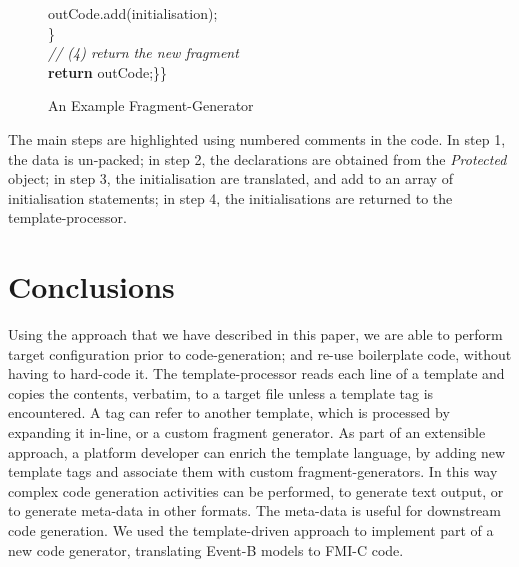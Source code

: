 \documentclass{llncs}%
\begin{document}
\begin{figure}[t]
\begin{minipage}{0.95\textwidth}
\begin{spacing}{0.8}
\hspace*{0.4cm}outCode.add(initialisation);\\
\hspace*{0.2cm}\}\\
\hspace*{0.2cm}\emph{// (4) return the new fragment}\\
\hspace*{0.2cm}\textbf{return} outCode;\}\}
\normalsize
\end{spacing}
\end{minipage}
\caption{An Example Fragment-Generator}
\label{fig:genCode}
\end{figure}
%
%
The main steps are highlighted using numbered comments in the code. In step 1, the data is un-packed; in step 2, the declarations are obtained from the \emph{Protected} object; in step 3, the initialisation are translated, and add to an array of initialisation statements; in step 4, the initialisations are returned to the template-processor. 
%
\section{Conclusions}\label{conc}
Using the approach that we have described in this paper, we are able to perform target configuration prior to code-generation; and re-use boilerplate code, without having to hard-code it. The template-processor reads each line of a template and copies the contents, verbatim, to a target file unless a template tag is encountered. A tag can refer to another template, which is processed by expanding it in-line, or a custom fragment generator. As part of an extensible approach, a platform developer can enrich the template language, by adding new template tags and associate them with custom fragment-generators. In this way complex code generation activities can be performed, to generate text output, or  to generate meta-data in other formats. The meta-data is useful for downstream code generation. We used the template-driven approach to implement part of a new code generator, translating Event-B models to FMI-C code. 
%


%
%
%
\end{document}
